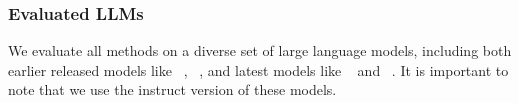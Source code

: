 \begin{itemize}[itemsep= 1 pt,topsep = 10 pt, parsep = 1 pt, left = 5 pt]
\end{itemize}



\subsubsection{Evaluated LLMs}
We evaluate all methods on a diverse set of large language models, including both earlier released models like \codellama~\cite{rozière2024codellamaopenfoundation}, \deepseekseven~\cite{guo2024deepseekcoder}, and latest models like \qwenseven~\cite{hui2024qwen25codertechnicalreport} and \seed~\cite{zhang2025seed}. It is important to note that we use the instruct version of these models.

